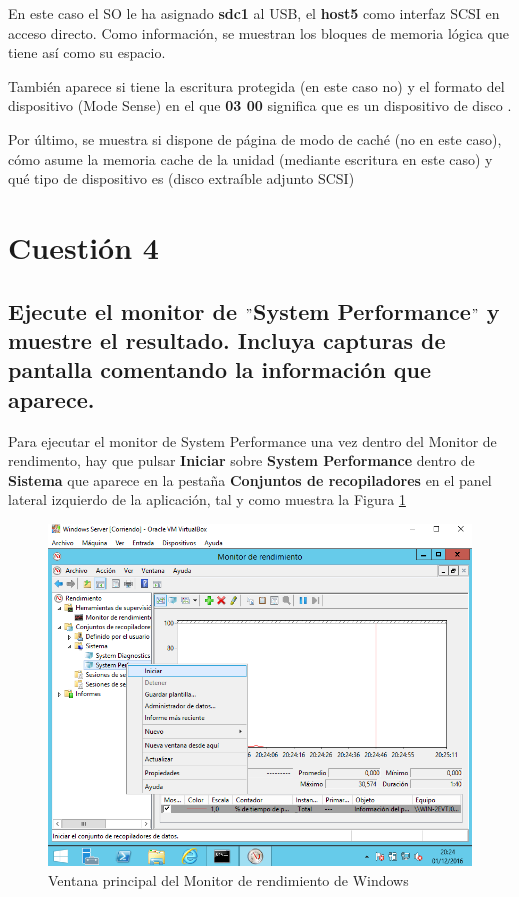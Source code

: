En este caso el SO le ha asignado \textbf{sdc1} al USB, el \textbf{host5} como interfaz SCSI en acceso directo.
Como información, se muestran los bloques de memoria lógica que tiene así como su espacio.

También aparece si tiene la escritura protegida (en este caso no) y el formato del dispositivo (Mode Sense) en el que \textbf{03 00} significa que es un dispositivo de disco \cite{enlace4}. 

Por último, se muestra si dispone de página de modo de caché (no en este caso), cómo asume la memoria cache de la unidad (mediante escritura en este caso) y qué tipo de dispositivo es (disco extraíble adjunto SCSI)


\section{Cuestión 4}
\subsection{Ejecute el monitor de $ " $System Performance$ " $ y muestre el
	resultado. Incluya capturas de pantalla comentando la información que
	aparece.}

Para ejecutar el monitor de System Performance una vez dentro del Monitor de rendimento, hay que pulsar \textbf{Iniciar} sobre \textbf{System Performance} dentro de \textbf{Sistema} que aparece en la pestaña \textbf{Conjuntos de recopiladores} en el panel lateral izquierdo de la aplicación, tal y como muestra la Figura \ref{fig:figura6}

\begin{figure}[H] %
	\centering
	\includegraphics[scale=0.6]{figuras/figura6.png} 
	\caption{Ventana principal del Monitor de rendimiento de Windows} 
	\label{fig:figura6}
\end{figure}

